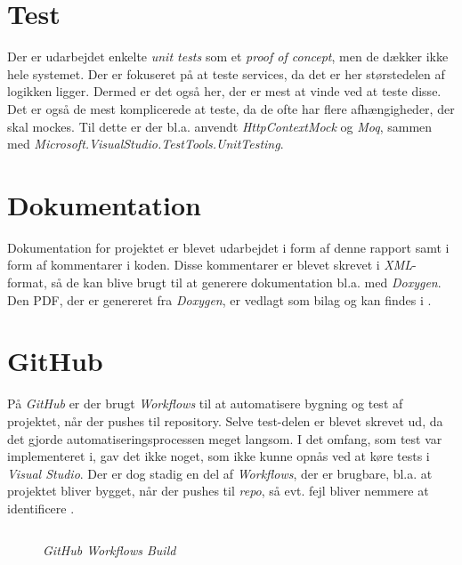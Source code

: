 \section{Test}
\label{sec:test}
Der er udarbejdet enkelte \emph{unit tests} som et \emph{proof of concept}, men de dækker ikke hele systemet. Der er fokuseret på at teste services, da det er her størstedelen af logikken ligger.
Dermed er det også her, der er mest at vinde ved at teste disse. Det er også de mest komplicerede at teste, da de ofte har flere afhængigheder, der skal mockes. 
Til dette er der bl.a. anvendt \emph{HttpContextMock} og \emph{Moq}, sammen med \emph{Microsoft.VisualStudio.TestTools.UnitTesting}.

\section{Dokumentation}
\label{sec:dokumentation}
Dokumentation for projektet er blevet udarbejdet i form af denne rapport samt i form af kommentarer i koden.
Disse kommentarer er blevet skrevet i \emph{XML}-format, så de kan blive brugt til at generere dokumentation bl.a. med \emph{Doxygen}.
Den PDF, der er genereret fra \emph{Doxygen}, er vedlagt som bilag og kan findes i .

\section{GitHub}
\label{subsec:final-product-github}
På \emph{GitHub} er der brugt \emph{Workflows} til at automatisere bygning og test af projektet, når der pushes til repository.
Selve test-delen er blevet skrevet ud, da det gjorde automatiseringsprocessen meget langsom. I det omfang, som test var implementeret i, gav det ikke noget, som ikke kunne opnås ved at køre tests i \emph{Visual Studio}.
Der er dog stadig en del af \emph{Workflows}, der er brugbare, bl.a. at projektet bliver bygget, når der pushes til \emph{repo}, så evt. fejl bliver nemmere at identificere .  

\begin{figure}
    \inputminted{yaml}{codefiles/build.yml}
    \caption{\emph{GitHub Workflows Build}}
    \label{minted:build-yml}
\end{figure}